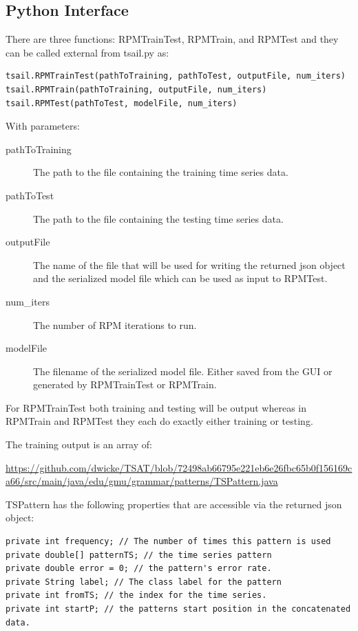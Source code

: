 \documentclass[letterpaper, 12pt]{article}
\begin{document}
\subsection{Python Interface}

There are three functions: RPMTrainTest, RPMTrain, and RPMTest and they can be called external from tsail.py as:

\begin{lstlisting}
tsail.RPMTrainTest(pathToTraining, pathToTest, outputFile, num_iters)
tsail.RPMTrain(pathToTraining, outputFile, num_iters)
tsail.RPMTest(pathToTest, modelFile, num_iters)
\end{lstlisting}

With parameters:
\begin{description}
	\item[pathToTraining] The path to the file containing the training time series data.
	\item[pathToTest] The path to the file containing the testing time series data.
	\item[outputFile] The name of the file that will be used for writing the returned json object and the serialized model file which can be used as input to RPMTest.
	\item[num\_iters] The number of RPM iterations to run.
	\item[modelFile]  The filename of the serialized model file.  Either saved from the GUI or generated by RPMTrainTest or RPMTrain.
\end{description}

For RPMTrainTest both training and testing will be output whereas in RPMTrain and RPMTest they each do exactly either training or testing. 

The training output is an array of:

\url{https://github.com/dwicke/TSAT/blob/72498ab66795e221eb6e26fbc65b0f156169ca66/src/main/java/edu/gmu/grammar/patterns/TSPattern.java}

TSPattern has the following properties that are accessible via the returned json object:

\begin{lstlisting}
private int frequency; // The number of times this pattern is used
private double[] patternTS; // the time series pattern
private double error = 0; // the pattern's error rate.
private String label; // The class label for the pattern
private int fromTS; // the index for the time series.
private int startP; // the patterns start position in the concatenated data.
\end{lstlisting}
\end{document}
